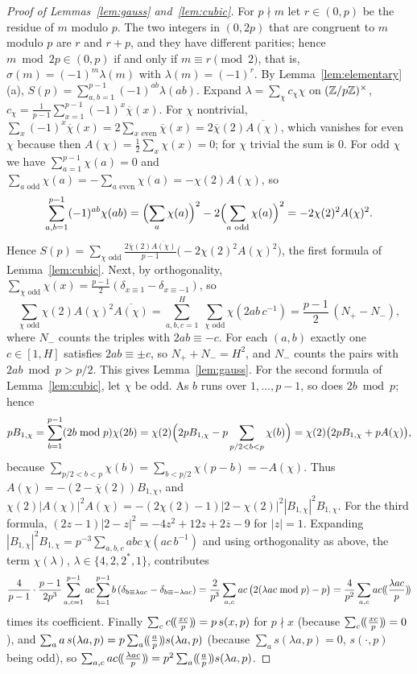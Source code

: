 \begin{proof}[Proof of Lemmas~\ref{lem:gauss} and~\ref{lem:cubic}]
For $p\nmid m$ let $r\in(0,p)$ be the residue of $m$ modulo $p$. The two integers in $(0,2p)$ that are congruent to $m$ modulo $p$ are $r$ and $r+p$, and they have different parities; hence $m\bmod2p\in(0,p)$ if and only if $m\equiv r\pmod2$, that is, $\sigma(m)=(-1)^m\lambda(m)$ with $\lambda(m)=(-1)^r$. By Lemma~\ref{lem:elementary}(a), $S(p)=\sum_{a,b=1}^{p-1}(-1)^{ab}\lambda(ab)$. Expand $\lambda=\sum_\chi c_\chi\chi$ on $(\mathbb{Z}/p\mathbb{Z})^\times$, $c_\chi=\frac1{p-1}\sum_{x=1}^{p-1}(-1)^x\overline\chi(x)$. For $\chi$ nontrivial, $\sum_x(-1)^x\overline\chi(x)=2\sum_{x\text{ even}}\overline\chi(x)=2\overline\chi(2)\overline{A(\chi)}$, which vanishes for even $\chi$ because then $A(\chi)=\frac12\sum_x\chi(x)=0$; for $\chi$ trivial the sum is $0$. For odd $\chi$ we have $\sum_{a=1}^{p-1}\chi(a)=0$ and $\sum_{a\text{ odd}}\chi(a)=-\sum_{a\text{ even}}\chi(a)=-\chi(2)A(\chi)$, so
\[
\sum_{a,b=1}^{p-1}(-1)^{ab}\chi(ab)=\Bigl(\sum_a\chi(a)\Bigr)^2-2\Bigl(\sum_{a\text{ odd}}\chi(a)\Bigr)^2=-2\chi(2)^2A(\chi)^2.
\]
Hence $S(p)=\sum_{\chi\text{ odd}}\frac{2\overline\chi(2)\overline{A(\chi)}}{p-1}\bigl(-2\chi(2)^2A(\chi)^2\bigr)$, the first formula of Lemma~\ref{lem:cubic}. Next, by orthogonality, $\sum_{\chi\text{ odd}}\chi(x)=\frac{p-1}2(\delta_{x\equiv1}-\delta_{x\equiv-1})$, so
\[
\sum_{\chi\text{ odd}}\chi(2)A(\chi)^2\overline{A(\chi)}=\sum_{a,b,c=1}^H\ \sum_{\chi\text{ odd}}\chi(2ab\,c^{-1})=\frac{p-1}2\,(N_+-N_-),
\]
where $N_-$ counts the triples with $2ab\equiv-c$. For each $(a,b)$ exactly one $c\in[1,H]$ satisfies $2ab\equiv\pm c$, so $N_++N_-=H^2$, and $N_-$ counts the pairs with $2ab\bmod p>p/2$. This gives Lemma~\ref{lem:gauss}. For the second formula of Lemma~\ref{lem:cubic}, let $\chi$ be odd. As $b$ runs over $1,\dots,p-1$, so does $2b\bmod p$; hence
\[
pB_{1,\chi}=\sum_{b=1}^{p-1}(2b\bmod p)\chi(2b)=\chi(2)\Bigl(2pB_{1,\chi}-p\sum_{p/2<b<p}\chi(b)\Bigr)=\chi(2)\bigl(2pB_{1,\chi}+pA(\chi)\bigr),
\]
because $\sum_{p/2<b<p}\chi(b)=\sum_{b<p/2}\chi(p-b)=-A(\chi)$. Thus $A(\chi)=-(2-\overline\chi(2))B_{1,\chi}$, and $\chi(2)|A(\chi)|^2A(\chi)=-(2\chi(2)-1)|2-\chi(2)|^2|B_{1,\chi}|^2B_{1,\chi}$. For the third formula, $(2z-1)|2-z|^2=-4z^2+12z+2\overline z-9$ for $|z|=1$. Expanding $|B_{1,\chi}|^2B_{1,\chi}=p^{-3}\sum_{a,b,c}abc\,\chi(ac\,b^{-1})$ and using orthogonality as above, the term $\chi(\lambda)$, $\lambda\in\{4,2,2^*,1\}$, contributes
\[
\frac4{p-1}\cdot\frac{p-1}{2p^3}\sum_{a,c=1}^{p-1}ac\sum_{b=1}^{p-1}b\,(\delta_{b\equiv\lambda ac}-\delta_{b\equiv-\lambda ac})=\frac2{p^3}\sum_{a,c}ac\,\bigl(2(\lambda ac\bmod p)-p\bigr)=\frac4{p^2}\sum_{a,c}ac(\!(\frac{\lambda ac}p)\!)
\]
times its coefficient. Finally $\sum_cc(\!(\frac{xc}p)\!)=p\,s(x,p)$ for $p\nmid x$ (because $\sum_c(\!(\frac{xc}p)\!)=0$), and $\sum_aa\,s(\lambda a,p)=p\sum_a(\!(\frac ap)\!)s(\lambda a,p)$ (because $\sum_as(\lambda a,p)=0$, $s(\cdot,p)$ being odd), so $\sum_{a,c}ac(\!(\frac{\lambda ac}p)\!)=p^2\sum_a(\!(\frac ap)\!)s(\lambda a,p)$.
\end{proof}


